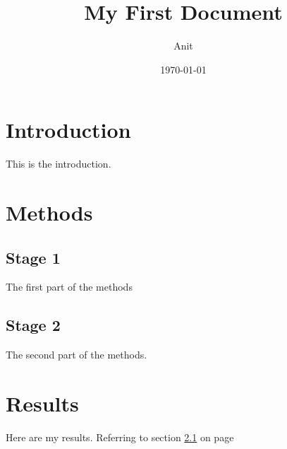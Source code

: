 \documentclass[a4paper,12pt]{article}
\begin{document}
\title{My First Document}
\author{Anit}
\date{\today}
\maketitle

\tableofcontents
\newpage
{}

\section{Introduction}
This is the introduction.

\section{Methods}

\subsection{Stage 1}
\label{sec1}
The first part of the methods

\subsection{Stage 2}
The second part of the methods.

\section{Results}
Here are my results. Referring to section \ref{sec1} on page \pageref{sec1}
\end{document}
